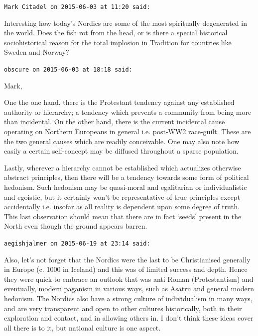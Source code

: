 \begin{footnotesize}
\begin{sffamily}
\texttt{Mark Citadel on 2015-06-03 at 11:20 said:}

Interesting how today's Nordics are some of the most spiritually degenerated in the world. Does the fish rot from the head, or is there a special historical sociohistorical reason for the total implosion in Tradition for countries like Sweden and Norway?

\hfill

\texttt{obscure on 2015-06-03 at 18:18 said:}

Mark,

One the one hand, there is the Protestant tendency against any established authority or hierarchy; a tendency which prevents a community from being more than incidental. On the other hand, there is the current incidental cause operating on Northern Europeans in general i.e. post-WW2 race-guilt. These are the two general causes which are readily conceivable. One may also note how easily a certain self-concept may be diffused throughout a sparse population.

Lastly, wherever a hierarchy cannot be established which actualizes otherwise abstract principles, then there will be a tendency towards some form of political hedonism. Such hedonism may be quasi-moral and egalitarian or individualistic and egoistic, but it certainly won't be representative of true principles except accidentally i.e. insofar as all reality is dependent upon some degree of truth. This last observation should mean that there are in fact `seeds' present in the North even though the ground appears barren.

\hfill

\texttt{aegishjalmer on 2015-06-19 at 23:14 said:}

Also, let's not forget that the Nordics were the last to be Christianised generally in Europe (c. 1000 in Iceland) and this was of limited success and depth. Hence they were quick to embrace an outlook that was anti Roman (Protestantism) and eventually, modern paganism in various ways, such as Asatru and general modern hedonism. The Nordics also have a strong culture of individualism in many ways, and are very transparent and open to other cultures historically, both in their exploration and contact, and in allowing others in. I don't think these ideas cover all there is to it, but national culture is one aspect.

\hfill


\end{sffamily}
\end{footnotesize}
